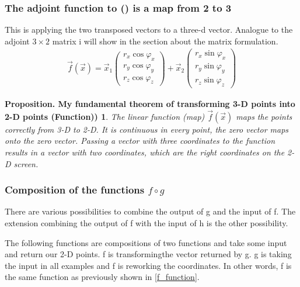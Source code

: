 \documentclass[a4paper]{article}
\begin{document}
\subsubsection{The adjoint function to () is a map from 2 to 3} 

This is applying the two transposed vectors to a three-d vector. Analogue to the adjoint $3 \times 2$ matrix i will show in the section about the matrix formulation.\\



\begin{displaymath}
\begin{align}
			\vec{f}(\vec{x}) = \vec{x}_{1}\begin{pmatrix}r_x\cos\varphi_x\\r_y\cos\varphi_y\\r_z\cos\varphi_z\end{pmatrix} + \vec{x}_{2}\begin{pmatrix}r_x\sin\varphi_x\\r_y\sin\varphi_y\\r_z\sin\varphi_z\end{pmatrix} 
	\end{align}
\end{displaymath}



\newtheorem{FunctionVersion}{Proposition. My fundamental theorem of transforming 3-D points into 2-D points (Function))}
\begin{FunctionVersion}
The linear function (map) $\vec{f}(\vec{x})$ maps the points correctly from 3-D to 2-D. It is continuous in every point, the zero vector maps onto the zero vector. Passing a vector with three coordinates to the function results in a vector with two coordinates, which are the right coordinates on the 2-D screen.
\end{FunctionVersion}


\subsubsection{Composition of the functions $f \circ g$}

There are various possibilities to combine the output of g and the input of f. 
The extension combining the output of f with the input of h is the other possibility.

The following functions are compositions of two functions and take some input and return our 2-D points.
f is transformingthe vector returned by g. g is taking the input in all examples and f is reworking the coordinates.
In other words, f is the same function as previously shown in \ref{f_function}.\\
\end{document}
